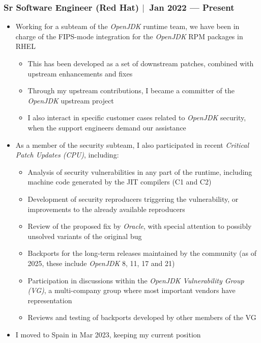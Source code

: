 \documentclass[12pt, a4paper]{article}
\newcommand{\mysep}{{\Large $\mid$}\ }
\newcommand{\timeFrame}[2]{{#1} --- {#2}}
\begin{document}
    \subsubsection*{Sr Software Engineer (Red Hat) \mysep \timeFrame{Jan 2022}{Present}}
    \begin{itemize}
        \item Working for a subteam of the \emph{OpenJDK} runtime team,
        we have been in charge of the FIPS-mode integration
        for the \emph{OpenJDK} RPM packages in RHEL
        \begin{itemize}
            \item This has been developed as a set of downstream patches,
            combined with upstream enhancements and fixes
            \item Through my upstream contributions,
            I became a committer of the \emph{OpenJDK} upstream project
            \item I also interact in specific customer cases
            related to \emph{OpenJDK} security,
            when the support engineers demand our assistance
        \end{itemize}
        \item As a member of the security subteam, I also participated in
        recent \emph{Critical Patch Updates (CPU)}, including:
        \begin{itemize}
            \item Analysis of security vulnerabilities in any part of the runtime,
            including machine code generated by the JIT compilers (C1 and C2)
            \item Development of security reproducers triggering the vulnerability,
            or improvements to the already available reproducers
            \item Review of the proposed fix by \emph{Oracle}, with special attention to
            possibly unsolved variants of the original bug
            \item Backports for the long-term releases maintained by the community
            (as of 2025, these include \emph{OpenJDK} 8, 11, 17 and 21)
            \item Participation in discussions within the \emph{OpenJDK Vulnerability Group (VG)},
            a multi-company group where most important vendors have representation
            \item Reviews and testing of backports developed by other members of the VG
        \end{itemize}
        \item I moved to Spain in Mar 2023, keeping my current position
    \end{itemize}
\end{document}
